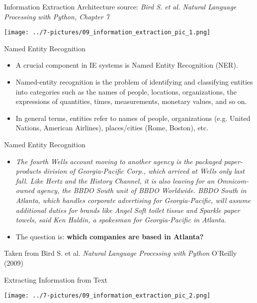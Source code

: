 \documentclass[11pt]{beamer}
\begin{document}
\begin{frame}{Information Extraction Architecture}
	\footnotesize{source: \textit{Bird S. et al. Natural Language Processing with Python, Chapter 7}}
	\begin{center}
	\texttt{[image: ../7-pictures/09\_information\_extraction\_pic\_1.png]}
	\end{center}
\end{frame}
\begin{frame}{Named Entity Recognition}
	\begin{itemize}
		\item A crucial component in IE systems is Named Entity Recognition (NER). 
		\item Named-entity recognition is the problem of identifying and classifying entities into categories such as the names of people, locations, organizations, the expressions of quantities, times, measurements, monetary values, and so on. 
		\item In general terms, entities refer to names of people, organizations (e.g. United Nations, American Airlines), places/cities (Rome, Boston), etc.
	\end{itemize}
\end{frame}
\begin{frame}{Named Entity Recognition}
	\begin{itemize}
		\item \textit{The fourth Wells account moving to another agency is the packaged paper-products division of Georgia-Pacific Corp., which arrived at Wells only last fall. Like Hertz and the History Channel, it is also leaving for an Omnicom-owned agency, the BBDO South unit of BBDO Worldwide. BBDO South in Atlanta, which handles corporate advertising for Georgia-Pacific, will assume additional duties for brands like Angel Soft toilet tissue and Sparkle paper towels, said Ken Haldin, a spokesman for Georgia-Pacific in Atlanta.}
		\item The question is: \textbf{which companies are based in Atlanta?}
	\end{itemize}
	Taken from Bird S. et al. \textit{Natural Language Processing with Python} O'Reilly (2009)
\end{frame}
\begin{frame}{Extracting Information from Text}
	\begin{center}
	\texttt{[image: ../7-pictures/09\_information\_extraction\_pic\_2.png]}
	\end{center}
\end{frame}
\end{document}
